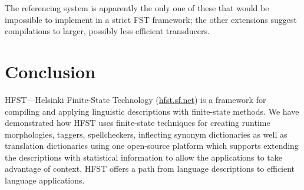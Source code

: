 \documentclass{llncs}
\begin{document}
The referencing system is apparently the only one of these that would be
impossible to implement in a strict FST framework; the other extensions suggest
compilations to larger, possibly less efficient transducers.






\section{Conclusion}
HFST---Helsinki Finite-State Technology (\url{hfst.sf.net})
is a framework for compiling and applying linguistic descriptions
with finite-state methods. We have demonstrated how HFST uses finite-state techniques 
for creating runtime morphologies, taggers, spellcheckers, inflecting synonym dictionaries as well as 
translation dictionaries using one open-source platform which supports extending  
the descriptions with statistical information to allow the applications 
to take advantage of context. HFST offers a path from language descriptions 
to efficient language applications.
\end{document}
